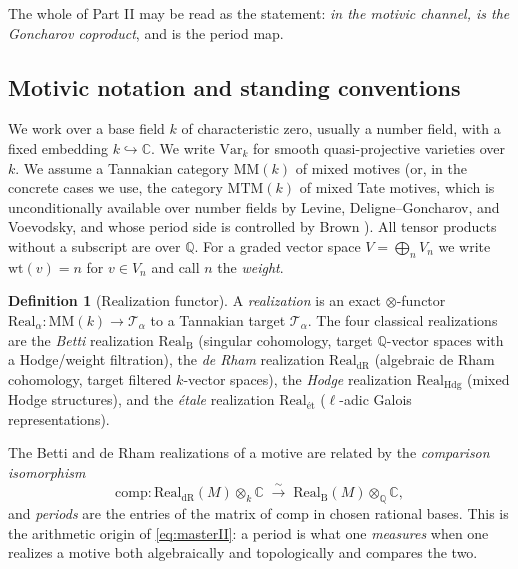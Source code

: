 \documentclass[12pt]{article}
\theoremstyle{definition}
\newtheorem{definition}[theorem]{Definition}
\theoremstyle{remark}
\newcommand{\Real}{\mathrm{Real}}
\newcommand{\Betti}{\mathrm{B}}
\newcommand{\dR}{\mathrm{dR}}
\newcommand{\Hdg}{\mathrm{Hdg}}
\newcommand{\et}{\text{\'et}}
\newcommand{\wt}{\mathrm{wt}}
\newcommand{\Qbb}{\mathbb{Q}}
\newcommand{\Cbb}{\mathbb{C}}
\begin{document}
The whole of Part II may be read as the statement: \emph{in the motivic channel,
 is the Goncharov coproduct}, and  is the period map.

\subsection{Motivic notation and standing conventions}

We work over a base field $k$ of characteristic zero, usually a number field, with a fixed
embedding $k\hookrightarrow\Cbb$. We write $\mathrm{Var}_k$ for smooth quasi-projective
varieties over $k$. We assume a Tannakian category $\mathrm{MM}(k)$ of mixed motives (or, in
the concrete cases we use, the category $\mathrm{MTM}(k)$ of mixed Tate motives, which is
unconditionally available over number fields by Levine, Deligne--Goncharov, and
Voevodsky, and whose period side is controlled by Brown \cite{BrownMTZ}). All tensor products
without a subscript are over $\Qbb$. For a graded vector space $V=\bigoplus_n V_n$ we write
$\wt(v)=n$ for $v\in V_n$ and call $n$ the \emph{weight}.

\begin{definition}[Realization functor]
\label{def:realization}
A \emph{realization} is an exact $\otimes$-functor $\Real_\alpha\colon \mathrm{MM}(k)\to
\mathcal{T}_\alpha$ to a Tannakian target $\mathcal{T}_\alpha$. The four classical
realizations are the \emph{Betti} realization $\Real_\Betti$ (singular cohomology,
target $\Qbb$-vector spaces with a Hodge/weight filtration), the \emph{de Rham} realization
$\Real_\dR$ (algebraic de Rham cohomology, target filtered $k$-vector spaces), the
\emph{Hodge} realization $\Real_\Hdg$ (mixed Hodge structures), and the \emph{\'etale}
realization $\Real_\et$ ($\ell$-adic Galois representations).
\end{definition}

The Betti and de Rham realizations of a motive are related by the \emph{comparison
isomorphism}
\begin{equation}
\label{eq:comparison}
\mathrm{comp}\colon \Real_\dR(M)\otimes_k\Cbb \;\xrightarrow{\ \sim\ }\;
\Real_\Betti(M)\otimes_\Qbb\Cbb,
\end{equation}
and \emph{periods} are the entries of the matrix of $\mathrm{comp}$ in chosen rational
bases. This is the arithmetic origin of \eqref{eq:masterII}: a period is what one
\emph{measures} when one realizes a motive both algebraically and topologically and compares
the two.
\end{document}
